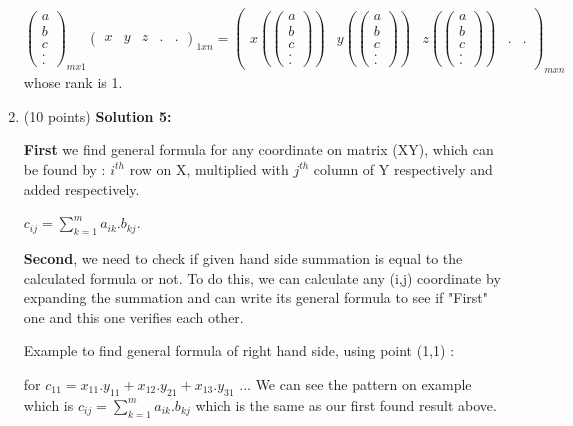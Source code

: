 \documentclass[11pt]{article}
\begin{document}
\begin{enumerate}
$\begin{pmatrix} a \\ b \\ c \\ . \\ . \end{pmatrix}_{mx1} \begin{pmatrix} x & y & z & . & . \end{pmatrix}_{1xn} = \begin{pmatrix} x (\begin{pmatrix} a \\ b \\ c \\ . \\ . \end{pmatrix}) & y (\begin{pmatrix} a \\ b \\ c \\ . \\ . \end{pmatrix}) & z (\begin{pmatrix} a \\ b \\ c \\ . \\ . \end{pmatrix}) & . & . \end{pmatrix}_{mxn}$ whose rank is 1.

\newpage

\item (10 points) \textbf{Solution 5:}

\textbf{First} we find general formula for any coordinate on matrix (XY), which can be found by : $i^{th}$ row on X, multiplied with $j^{th}$ column of Y respectively and added respectively.

$c_{ij} = \sum_{k=1}^m a_{ik} . b_{kj}$.


\textbf{Second}, we need to check if given hand side summation is equal to the calculated formula or not. To do this, we can calculate any (i,j) coordinate by expanding the summation and can write its general formula to see if "First" one and this one verifies each other.

Example to find general formula of right hand side, using point (1,1) : 

for $c_{11} = x_{11}.y_{11} + x_{12}.y_{21}+ x_{13}.y_{31}$ ...
We can see the pattern on example which is $c_{ij} = \sum_{k=1}^m a_{ik} . b_{kj}$ which is the same as our first found result above.


\end{enumerate}
\end{document}
